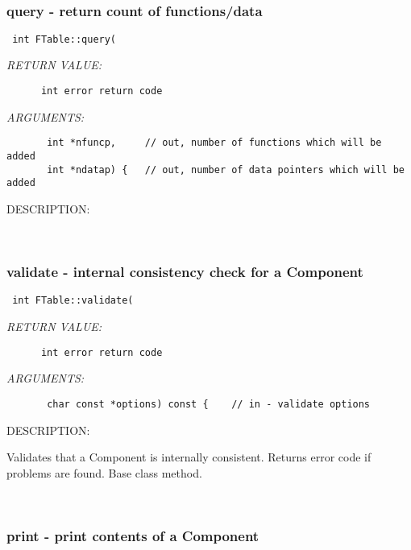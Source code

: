 \mbox{}\hrulefill\
 
\subsubsection [query] {query - return count of functions/data}


  
\begin{verbatim} int FTable::query(\end{verbatim}{\em RETURN VALUE:}
\begin{verbatim}      int error return code\end{verbatim}{\em ARGUMENTS:}
\begin{verbatim}       int *nfuncp,     // out, number of functions which will be added
       int *ndatap) {   // out, number of data pointers which will be added\end{verbatim}
{\sf DESCRIPTION:\\ }


   
 
\mbox{}\hrulefill\
 
\subsubsection [validate] {validate - internal consistency check for a Component}


  
\begin{verbatim} int FTable::validate(\end{verbatim}{\em RETURN VALUE:}
\begin{verbatim}      int error return code\end{verbatim}{\em ARGUMENTS:}
\begin{verbatim}       char const *options) const {    // in - validate options\end{verbatim}
{\sf DESCRIPTION:\\ }


        Validates that a Component is internally consistent.
        Returns error code if problems are found.  Base class method.
   
 
\mbox{}\hrulefill\
 
\subsubsection [print] {print - print contents of a Component}


